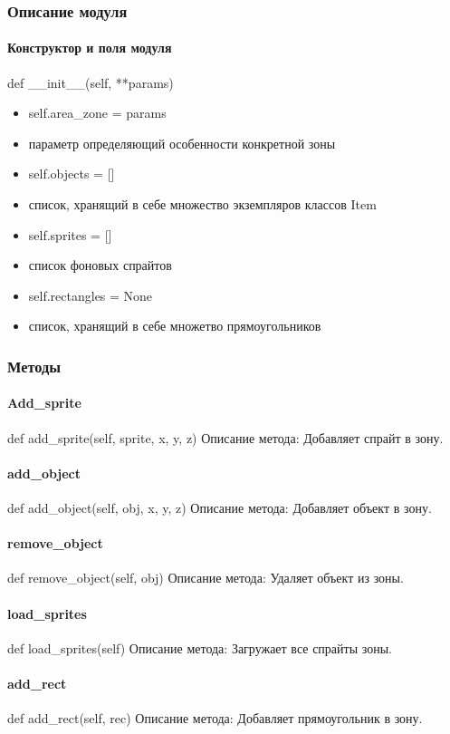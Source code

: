 \subsubsection{Описание модуля}
\paragraph{Конструктор и поля модуля}
def \_\_init\_\_(self, **params)
\begin{itemize}
	\item self.area\_zone = params 
	\item параметр определяющий особенности конкретной зоны
	\item self.objects = [] 
	\item список, хранящий в себе множество экземпляров классов Item
	\item self.sprites = [] 
	\item список фоновых спрайтов
	\item self.rectangles = None 
	\item список, хранящий в себе множетво прямоугольников
\end{itemize}
\subsubsection{Методы}
\paragraph{Add\_sprite}
def add\_sprite(self, sprite, x, y, z)
Описание метода: Добавляет спрайт в зону.
\paragraph{add\_object}
def add\_object(self, obj, x, y, z)
Описание метода: Добавляет объект в зону.
\paragraph{remove\_object}
def remove\_object(self, obj)
Описание метода: Удаляет объект из зоны.
\paragraph{load\_sprites}
def load\_sprites(self)
Описание метода: Загружает все спрайты зоны.
\paragraph{add\_rect}
def add\_rect(self, rec)
Описание метода: Добавляет прямоугольник в зону.
